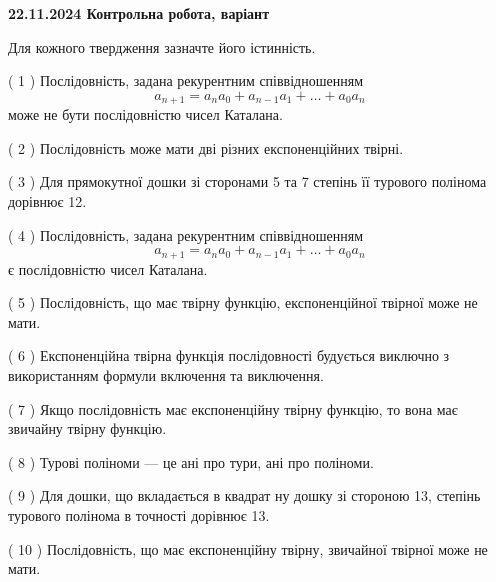 \documentclass[12pt, ukrainian]{article}
\begin{document}
\vspace{4mm}
\newpage
\begin {large}

\textbf{22.11.2024 Контрольна робота, варіант  }\par


{
Для кожного твердження зазначте його істинність.\par
\vspace{2mm}
( 1 ) Послідовність, задана рекурентним співвідношенням $$a_{n+1}=a_{n}a_{0}+a_{n-1}a_{1}+\ldots+a_0a_{n}$$ може не бути послідовністю чисел Каталана.%

( 2 ) Послідовність може мати дві різних експоненційних твірні.%

( 3 ) Для прямокутної дошки зі сторонами 5 та 7 степінь її турового полінома дорівнює 12.%

( 4 ) Послідовність, задана рекурентним співвідношенням $$a_{n+1}=a_{n}a_{0}+a_{n-1}a_{1}+\ldots+a_0a_{n}$$ є послідовністю чисел Каталана.%

( 5 ) Послідовність, що має твірну функцію, експоненційної твірної може не мати.%

( 6 ) Експоненційна твірна функція послідовності будується виключно з використанням формули включення та виключення.%

( 7 ) Якщо послідовність має експоненційну твірну функцію, то вона має звичайну твірну функцію.%

( 8 ) Турові поліноми --- це ані про тури, ані про поліноми.%

( 9 ) Для дошки, що вкладається в квадрат ну дошку зі стороною 13, степінь турового полінома в точності дорівнює 13.%

( 10 ) Послідовність, що має експоненційну твірну, звичайної твірної може не мати.%


\vspace{5mm}
}
\end {large}
\end{document}
